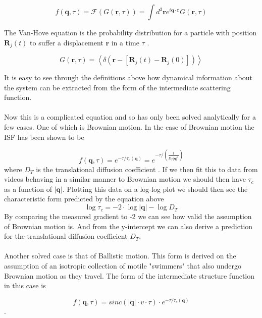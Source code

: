 \documentclass[11pt]{article}
\begin{document}
\begin{equation}
	f(\textbf{q}, \tau) = \mathscr{F} (G(\textbf{r}, \tau)) = \int d^3 \textbf{r} e^{i \textbf{q} \cdot \textbf{r}} G(\textbf{r}, \tau)
\end{equation}

The Van-Hove equation is the probability distribution for a particle with position $\textbf{R}_j(t)$ to suffer a displacement $\textbf{r}$ in a time $\tau$ \cite{DLSPecora}.

\begin{equation}
	G(\textbf{r}, \tau) = \left\langle \delta (\textbf{r} - [\textbf{R}_j(t) - \textbf{R}_j(0)]) \right\rangle
\end{equation}

It is easy to see through the definitions above how dynamical information about the system can be extracted from the form of the intermediate scattering function.
\\\\
Now this is a complicated equation and so has only been solved analytically for a few cases. One of which is Brownian motion. In the case of Brownian motion the ISF has been shown to be

\begin{equation}
\label{eqn:BrownianISF}
	f(\textbf{q}, \tau) = e^{- \tau / \tau_c(\textbf{q})} = e^{- \tau / (\frac{1}{D_T |\textbf{q}|^2})}
\end{equation}
where $D_T$ is the translational diffusion coefficient \cite{ddm1}. If we then fit this to data from videos behaving in a similar manner to Brownian motion we should then have $\tau_c$ as a function of $|\textbf{q}|$. Plotting this data on a log-log plot we should then see the characteristic form predicted by the equation above
\begin{equation}
\log{\tau_c} = -2 \cdot \log{|\textbf{q}|} - \log{D_T}
\end{equation}
By comparing the measured gradient to -2 we can see how valid the assumption of Brownian motion is. And from the y-intercept we can also derive a prediction for the translational diffusion coefficient $D_T$.
\\\\
Another solved case is that of Ballistic motion. This form is derived on the assumption of an isotropic collection of motile "swimmers" that also undergo Brownian motion as they travel. The form of the intermediate structure function in this case is 

\begin{equation}
\label{eqn:BallisticISF}
	f(\textbf{q}, \tau) = sinc(|\textbf{q}| \cdot v \cdot \tau) \cdot e^{- \tau / \tau_c(\textbf{q})}
\end{equation} \cite{DLSPecora}.
\end{document}
